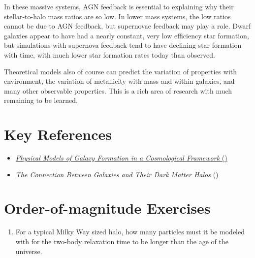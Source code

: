 In these massive systems, AGN feedback is essential to explaining why
their stellar-to-halo mass ratios are so low. In lower mass
systems, the low ratios cannot be due to AGN feedback, but supernovae
feedback may play a role. Dwarf galaxies appear to have had a nearly
constant, very low efficiency star formation, but simulations with
supernova feedback tend to have declining star formation with time,
with much lower star formation rates today than observed.

Theoretical models also of course can predict the variation of
properties with environment, the variation of metallicity with mass
and within galaxies, and many other observable properties. This is a
rich area of research with much remaining to be learned.

%



\section{Key References}

\begin{itemize}
  \item
    \href{https://ui.adsabs.harvard.edu/abs/2015ARA%26A..53...51S/abstract}
    {{\it Physical Models of Galaxy Formation in a Cosmological
        Framework} (\citealt{somerville15a})}
  \item
    \href{https://ui.adsabs.harvard.edu/abs/2018ARA%26A..56..435W/abstract}
      {{\it The Connection Between Galaxies and Their Dark Matter
          Halos} (\citealt{wechsler18a})}
\end{itemize}

\section{Order-of-magnitude Exercises}

\begin{enumerate} 
\item For a typical Milky Way sized halo, how many particles must it
    be modeled with for the two-body relaxation time to be longer than
    the age of the universe.
\end{enumerate} 

